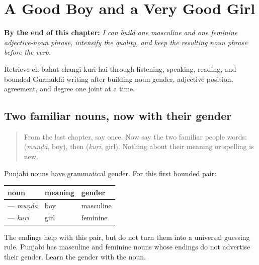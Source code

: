 
\chapter{A Good Boy and a Very Good Girl}
\label{ch:pa-noun-phrase-agreement-a1}

\begin{chapteropening}
\textbf{By the end of this chapter:} \emph{I can build one masculine and one feminine adjective-noun phrase, intensify the quality, and keep the resulting noun phrase before the verb.}

Retrieve eh bahut changi kuri hai through listening, speaking, reading, and bounded Gurmukhi writing after building noun gender, adjective position, agreement, and degree one joint at a time.
\end{chapteropening}

\section[\texorpdfstring{\pa{ਮੁੰਡਾ} · \pa{ਕੁੜੀ} (munda · kuri)}{ਮੁੰਡਾ · ਕੁੜੀ (munda · kuri)}]{Two familiar nouns, now with their gender}

\label{lesson:PA-C177-noun-gender}



\begin{quote}
From the last chapter, say \textbf{   } once. Now say the two familiar people words: \textbf{} (\emph{muṇḍā}, boy), then \textbf{} (\emph{kuṛī}, girl). Nothing about their meaning or spelling is new.
\end{quote}

\begin{grammarlens}[title={Grammar Lens: masculine and feminine nouns}]
Punjabi nouns have grammatical gender. For this first bounded pair:

\noindent
\begin{tabularx}{\linewidth}{@{}>{\raggedright\arraybackslash}X>{\raggedright\arraybackslash}X>{\raggedright\arraybackslash}X@{}}
\toprule
\textbf{noun} & \textbf{meaning} & \textbf{gender} \\
\midrule
\textbf{\pa{ਮੁੰਡਾ}} — \emph{muṇḍā} & boy & masculine \\
\textbf{\pa{ਕੁੜੀ}} — \emph{kuṛī} & girl & feminine \\
\bottomrule
\end{tabularx}

The endings help with this pair, but do not turn them into a universal guessing rule. Punjabi has masculine and feminine nouns whose endings do not advertise their gender. Learn the gender with the noun.
\end{grammarlens}


